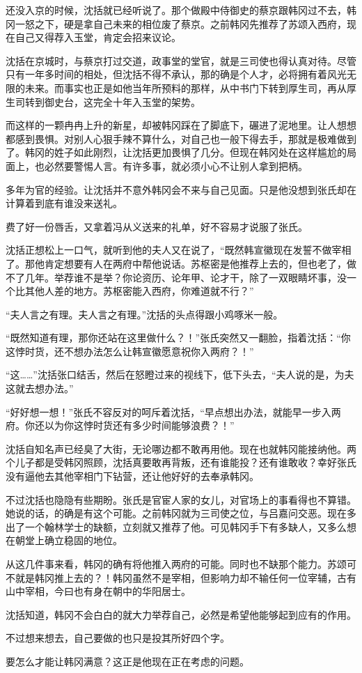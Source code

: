 还没入京的时候，沈括就已经听说了。那个做殿中侍御史的蔡京跟韩冈过不去，韩冈一怒之下，硬是拿自己未来的相位废了蔡京。之前韩冈先推荐了苏颂入西府，现在自己又得荐入玉堂，肯定会招来议论。

沈括在京城时，与蔡京打过交道，政事堂的堂官，就是三司使也得认真对待。尽管只有一年多时间的相处，但沈括不得不承认，那的确是个人才，必将拥有着风光无限的未来。而事实也正是如他当年所预料的那样，从中书门下转到厚生司，再从厚生司转到御史台，这完全十年入玉堂的架势。

而这样的一颗冉冉上升的新星，却被韩冈踩在了脚底下，碾进了泥地里。让人想想都感到畏惧。对别人心狠手辣不算什么，对自己也一般下得去手，那就是极难做到了。韩冈的姓子如此刚烈，让沈括更加畏惧了几分。但现在韩冈处在这样尴尬的局面上，也必然要警惕人言。有许多事，就必须小心不让别人拿到把柄。

多年为官的经验。让沈括并不意外韩冈会不来与自己见面。只是他没想到张氏却在计算着到底有谁没来送礼。

费了好一份唇舌，又拿着冯从义送来的礼单，好不容易才说服了张氏。

沈括正想松上一口气，就听到他的夫人又在说了，“既然韩宣徽现在发誓不做宰相了。那他肯定想要有人在两府中帮他说话。苏枢密是他推荐上去的，但也老了，做不了几年。举荐谁不是举？你论资历、论年甲、论才干，除了一双眼睛坏事，没一个比其他人差的地方。苏枢密能入西府，你难道就不行？”

“夫人言之有理。夫人言之有理。”沈括的头点得跟小鸡啄米一般。

“既然知道有理，那你还站在这里做什么？！”张氏突然又一翻脸，指着沈括：“你这悖时货，还不想办法怎么让韩宣徽愿意祝你入两府？！”

“这……”沈括张口结舌，然后在怒瞪过来的视线下，低下头去，“夫人说的是，为夫这就去想办法。”

“好好想一想！”张氏不容反对的呵斥着沈括，“早点想出办法，就能早一步入两府。你还以为你这悖时货还有多少时间能够浪费？！”

沈括自知名声已经臭了大街，无论哪边都不敢再用他。现在也就韩冈能接纳他。两个儿子都是受韩冈照顾，沈括真要敢再背叛，还有谁能投？还有谁敢收？幸好张氏没有逼他去其他宰相门下钻营，还让他好好的去奉承韩冈。

不过沈括也隐隐有些期盼。张氏是官宦人家的女儿，对官场上的事看得也不算错。她说的话，的确是有这个可能。之前韩冈就为三司使之位，与吕嘉问交恶。现在多出了一个翰林学士的缺额，立刻就又推荐了他。可见韩冈手下有多缺人，又多么想在朝堂上确立稳固的地位。

从这几件事来看，韩冈的确有将他推入两府的可能。同时也不缺那个能力。苏颂可不就是韩冈推上去的？！韩冈虽然不是宰相，但影响力却不输任何一位宰辅，古有山中宰相，今曰也有身在朝中的华阳居士。

沈括知道，韩冈不会白白的就大力举荐自己，必然是希望他能够起到应有的作用。

不过想来想去，自己要做的也只是投其所好四个字。

要怎么才能让韩冈满意？这正是他现在正在考虑的问题。


